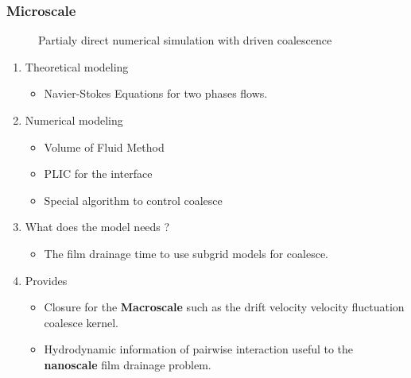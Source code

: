 \documentclass{sintefbeamer}
\begin{document}
\begin{frame}
  \frametitle{Microscale}

  \begin{figure}
    \caption{Partialy direct numerical simulation with driven coalescence}
  \end{figure}

  \begin{enumerate}
    \item Theoretical modeling 
    \begin{itemize}
      \item Navier-Stokes Equations for two phases flows.
    \end{itemize}
    \item Numerical modeling 
    \begin{itemize}
      \item Volume of Fluid Method
      \item PLIC for the interface 
      \item Special algorithm to control coalesce
    \end{itemize}
    \item What does the model needs ? 
    \begin{itemize}
      \item The film drainage time to use subgrid models for coalesce. 
    \end{itemize}
    \item Provides 
    \begin{itemize}
      \item Closure for the \textbf{Macroscale} such as the drift velocity velocity fluctuation coalesce kernel. 
      \item Hydrodynamic information of pairwise interaction useful to the  \textbf{nanoscale} film drainage problem. 
    \end{itemize}
  \end{enumerate}
\end{frame}
\end{document}
